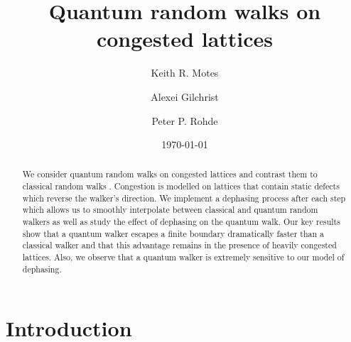 \documentclass[aps,pra,twocolumn,amsmath,amssymb,nofootinbib,superscriptaddress]{revtex4}
\newcommand{\keith}[1]{{\color{cyan}{#1}}}
\begin{document}


\title{Quantum random walks on congested lattices}

\author{Keith R. Motes}

\author{Alexei Gilchrist}

\author{Peter P. Rohde}

\date{\today}

\frenchspacing
\begin{abstract}
We consider quantum random walks on congested lattices and contrast them to classical random walks \keith{C, K) in the transient regime}. Congestion is modelled on lattices that contain static defects which reverse the walker's direction. We implement a dephasing process after each step which allows us to smoothly interpolate between classical and quantum random walkers as well as study the effect of dephasing on the quantum walk. Our key results show that a quantum walker escapes a finite boundary dramatically faster than a classical walker and that this advantage remains in the presence of heavily congested lattices. Also, we observe that a quantum walker is extremely sensitive to our model of dephasing.

\end{abstract}
\maketitle

\section{Introduction}
\end{document}
